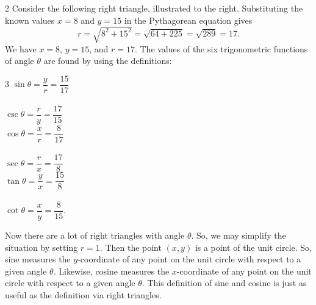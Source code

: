 \documentclass{book}
\begin{document}
\begin{Exam} 
\begin{multicols}{2}
Consider the following right triangle, illustrated to the right. Substituting the known values $x = 8$ and $y = 15$ in the Pythagorean equation gives \[r = \sqrt{8^2 + 15^2} = \sqrt{64 + 225} = \sqrt{289} = 17.\] We have $x= 8$, $y = 15$, and $r = 17$. The values of the six trigonometric functions of angle $\theta$ are found by using the definitions:
\begin{center}
\end{center}
\end{multicols}

\begin{multicols}{3}
\noindent$\sin\theta = \dfrac{y}{r} = \dfrac{15}{17}$\\\\
$\csc\theta =  \dfrac{r}{y} = \dfrac{17}{15}$\\
$\cos\theta = \dfrac{x}{r} = \dfrac{8}{17}$\\\\
$\sec\theta = \dfrac{r}{x} = \dfrac{17}{8}$\\
$\tan\theta = \dfrac{y}{x} = \dfrac{15}{8}$\\\\
$\cot\theta = \dfrac{x}{y} = \dfrac{8}{15}. $
\end{multicols}
\end{Exam}\vs

Now there are a lot of right triangles with angle $\theta$. So, we may simplify the situation by setting $r=1$. Then the point $(x,y)$ is a point of the unit circle. So, sine measures the $y$-coordinate of any point on the unit circle with respect to a given angle $\theta$. Likewise, cosine measures the $x$-coordinate of any point on the unit circle with respect to a given angle $\theta$. This definition of sine and cosine is just as useful as the definition via right triangles. \\
\end{document}
